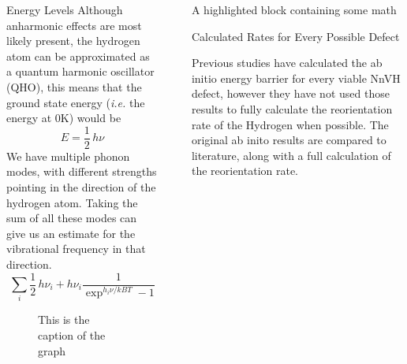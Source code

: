 \documentclass[final]{beamer}
\newlength{\sepwidth}
\newlength{\colwidth}
\newcommand{\separatorcolumn}{\begin{column}{\sepwidth}\end{column}}
\begin{document}
\begin{frame}[t]
\begin{columns}[t]
\begin{column}{\colwidth}
\begin{block}{Energy Levels}
    Although anharmonic effects are most likely present, the hydrogen atom can be approximated as a quantum harmonic oscillator (QHO), this means that the ground state energy (\emph{i.e.} the energy at 0K) would be 
    $$E = \frac{1}{2}\,h\nu$$
    We have multiple phonon modes, with different strengths pointing in the direction of the hydrogen atom. Taking the sum of all these modes can give us an estimate for the vibrational frequency in that direction. 
    $$ \sum_i \frac{1}{2}\,h\nu_i + h\nu_i \frac{1}{\exp^{h_i\nu/kBT} - 1} $$

  \end{block}

  \begin{block}{}


\begin{figure}[htbp]
    \centering

    \resizebox{\textwidth}{!}{
    
    }
    
    \caption{This is the caption of the graph}
    \label{fig:mygraph}
\end{figure}


  \end{block}

\end{column}

\separatorcolumn

\begin{column}{\colwidth}

  \begin{exampleblock}{A highlighted block containing some math}


  \end{exampleblock}

  \begin{block}{Calculated Rates for Every Possible Defect}

    Previous studies have calculated the ab initio energy barrier for every viable NnVH defect, however they have not used those results to fully calculate the reorientation rate of the Hydrogen when possible. The original ab inito results are compared to literature, along with a full calculation of the reorientation rate.


\end{block}
\end{column}
\end{columns}
\end{frame}
\end{document}
